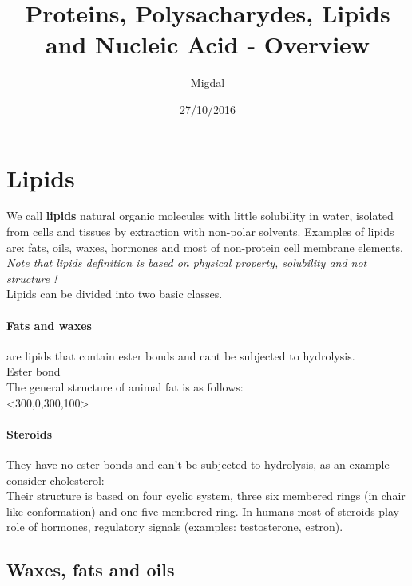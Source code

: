 \documentclass{article}
\author{Migdal}
\date{27/10/2016}
\title{Proteins, Polysacharydes, Lipids and Nucleic Acid - Overview}
\begin{document}
\maketitle


\section{Lipids}
We call \textbf{lipids} natural organic molecules with little solubility in water,
isolated from cells and tissues by extraction with non-polar solvents. Examples of
lipids are: fats, oils, waxes, hormones and most of non-protein cell membrane
elements. \textit{Note that lipids definition is based on physical property,
solubility and not structure !}
\\
Lipids can be divided into two basic classes.
\paragraph{Fats and waxes}
are lipids that contain ester bonds and cant be subjected to hydrolysis.\\
 Ester bond\\
The general structure of animal fat is as follows:\\

\hspace{7cm}<300,0,300,100>
\newpage
\paragraph{Steroids}
They have no ester bonds and can't be subjected to hydrolysis, as an example consider 
cholesterol:\\
Their structure is based on four cyclic system, three six membered rings (in chair
like conformation) and one five membered ring. In humans most of steroids play role
of hormones, regulatory signals (examples: testosterone, estron).

\subsection{Waxes, fats and oils}
\end{document}
